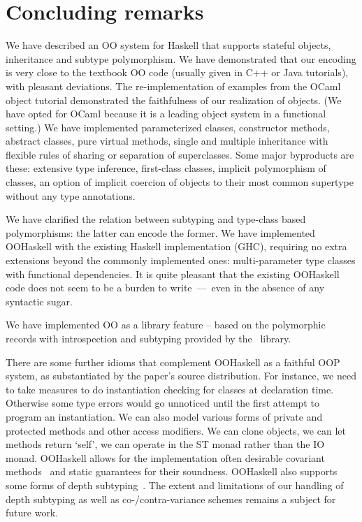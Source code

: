 \medskip
 
\section{Concluding remarks}
\label{S:concl}

We have described an OO system for Haskell that supports stateful
objects, inheritance and subtype polymorphism. We have demonstrated
that our encoding is very close to the textbook OO code (usually given
in C++ or Java tutorials), with pleasant deviations. The
re-implementation of examples from the OCaml object tutorial
demonstrated the faithfulness of our realization of objects. (We have
opted for OCaml because it is a leading object system in a functional
setting.) We have implemented parameterized classes, constructor
methods, abstract classes, pure virtual methods, single and multiple
inheritance with flexible rules of sharing or separation of
superclasses. Some major byproducts are these: extensive type
inference, first-class classes, implicit polymorphism of classes, an
option of implicit coercion of objects to their most common supertype
without any type annotations.

We have clarified the relation between subtyping and type-class based
polymorphisms: the latter can encode the former. We have implemented
OOHaskell with the existing Haskell implementation (GHC), requiring no
extra extensions beyond the commonly implemented ones: multi-parameter
type classes with functional dependencies. It is quite pleasant that
the existing OOHaskell code does not seem to be a burden to
write~---~even in the absence of any syntactic sugar.

We have implemented OO as a library feature -- based on the
polymorphic records with introspection and subtyping provided by the
\HList\ library.

There are some further idioms that complement OOHaskell as a faithful
OOP system, as substantiated by the paper's source distribution. For
instance, we need to take measures to do instantiation checking for
classes at declaration time. Otherwise some type errors would go
unnoticed until the first attempt to program an instantiation. We can
also model various forms of private and protected methods and other
access modifiers. We can clone objects, we can let methods return
`self', we can operate in the ST monad rather than the IO
monad. OOHaskell allows for the implementation often desirable
covariant methods~\cite{SG04,catcall} and static guarantees for their
soundness. OOHaskell also supports some forms of depth
subtyping~\cite{Poll97}. The extent and limitations of our handling of
depth subtyping as well as co-/contra-variance schemes remains a
subject for future work.

